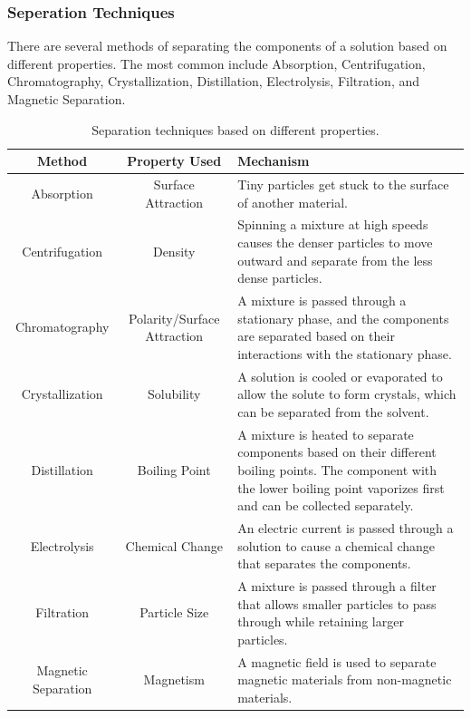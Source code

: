 \subsubsection{Seperation Techniques}
There are several methods of separating the components of a solution based on different properties. The most common include Absorption, Centrifugation, Chromatography, Crystallization, Distillation, Electrolysis, Filtration, and Magnetic Separation. 
\begin{table}[hbt]
    \centering
    \begin{tabularx}{\textwidth}{|c|c|X| }
        \hline
        \textbf{Method} & \textbf{Property Used} & \textbf{Mechanism} \\
        \hline
        Absorption & Surface Attraction &  Tiny particles get stuck to the surface of another material.\\
        Centrifugation & Density &  Spinning a mixture at high speeds causes the denser particles to move outward and separate from the less dense particles.\\
        Chromatography & Polarity/Surface Attraction &  A mixture is passed through a stationary phase, and the components are separated based on their interactions with the stationary phase.\\
        Crystallization & Solubility &  A solution is cooled or evaporated to allow the solute to form crystals, which can be separated from the solvent.\\
        Distillation & Boiling Point &  A mixture is heated to separate components based on their different boiling points. The component with the lower boiling point vaporizes first and can be collected separately.\\
        Electrolysis & Chemical Change &  An electric current is passed through a solution to cause a chemical change that separates the components.\\
        Filtration & Particle Size &  A mixture is passed through a filter that allows smaller particles to pass through while retaining larger particles.\\
        Magnetic Separation & Magnetism &  A magnetic field is used to separate magnetic materials from non-magnetic materials.\\
        \hline
    \end{tabularx}
    \caption{Separation techniques based on different properties.}
    \label{tab:separation_techniques}
\end{table}
